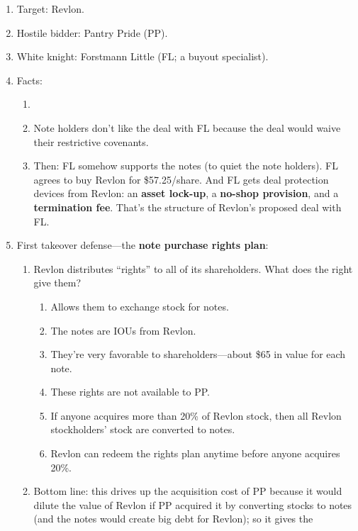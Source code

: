 \begin{enumerate}
    \item Target: Revlon.
    \item Hostile bidder: Pantry Pride (PP).
    \item White knight: Forstmann Little (FL; a buyout specialist).
    \item Facts:
    \begin{enumerate}
        \item %
        \item Note holders don't like the deal with FL because the deal would 
        waive their restrictive covenants.
        \item Then: FL somehow supports the notes (to quiet the note holders). 
        FL agrees to buy Revlon for \$57.25/share. And FL gets deal protection 
        devices from Revlon: an \textbf{asset lock-up}, a \textbf{no-shop provision}, and a 
        \textbf{termination fee}. That's the structure of Revlon's proposed deal 
        with FL.
    \end{enumerate}
    \item First takeover defense---the \textbf{note purchase rights plan}:
    \begin{enumerate}
        \item Revlon distributes ``rights'' to all of its shareholders. What 
        does the right give them?
        \begin{enumerate}
            \item Allows them to exchange stock for notes.
            \item The notes are IOUs from Revlon.
            \item They're very favorable to shareholders---about \$65 in value 
            for each note.
            \item These rights are not available to PP.
            \item If anyone acquires more than 20\% of Revlon stock, then all 
            Revlon stockholders' stock are converted to notes.
            \item Revlon can redeem the rights plan anytime before anyone 
            acquires 20\%.
        \end{enumerate}
        \item Bottom line: this drives up the acquisition cost of PP because it 
        would dilute the value of Revlon if PP acquired it by converting stocks 
        to notes (and the notes would create big debt for Revlon); so it gives the 

\end{enumerate}
\end{enumerate}
